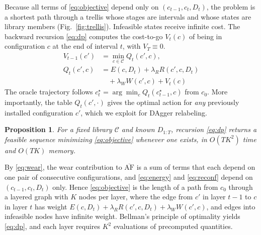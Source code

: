 \documentclass[conference]{IEEEtran}
\newtheorem{proposition}{Proposition}
\begin{document}
Because all terms of \eqref{eq:objective} depend only on $(c_{t-1},c_t,D_t)$, the problem is a shortest path through a trellis whose stages are intervals and whose states are library members (Fig.~\ref{fig:trellis}). Infeasible states receive infinite cost. The backward recursion \eqref{eq:dp} computes the cost-to-go $V_t(c)$ of being in configuration $c$ at the end of interval $t$, with $V_T\equiv 0$.
\begin{equation}\label{eq:dp}
\begin{aligned}V_{t-1}(c')&=\min_{c\in\mathcal{C}}Q_t(c',c),\\
Q_t(c',c)&=E(c,D_t)+\lambda_R R(c',c,D_t)\\
&\quad+\lambda_W W(c',c)+V_t(c)\end{aligned}
\end{equation}
The oracle trajectory follows $c^\star_t=\arg\min_c Q_t(c^\star_{t-1},c)$ from $c_0$. More importantly, the table $Q_t(c',\cdot)$ gives the optimal action for \emph{any} previously installed configuration $c'$, which we exploit for DAgger relabeling.

\begin{proposition}\label{prop:dp}
For a fixed library $\mathcal{C}$ and known $D_{1:T}$, recursion \eqref{eq:dp} returns a feasible sequence minimizing \eqref{eq:objective} whenever one exists, in $O(TK^2)$ time and $O(TK)$ memory.
\end{proposition}
\begin{IEEEproof}
By \eqref{eq:wear}, the wear contribution to $\overline{\mathrm{AF}}$ is a sum of terms that each depend on one pair of consecutive configurations, and \eqref{eq:energy} and \eqref{eq:reconf} depend on $(c_{t-1},c_t,D_t)$ only. Hence \eqref{eq:objective} is the length of a path from $c_0$ through a layered graph with $K$ nodes per layer, where the edge from $c'$ in layer $t-1$ to $c$ in layer $t$ has weight $E(c,D_t)+\lambda_R R(c',c,D_t)+\lambda_W W(c',c)$, and edges into infeasible nodes have infinite weight. Bellman's principle of optimality yields \eqref{eq:dp}, and each layer requires $K^2$ evaluations of precomputed quantities.
\end{IEEEproof}
\end{document}
